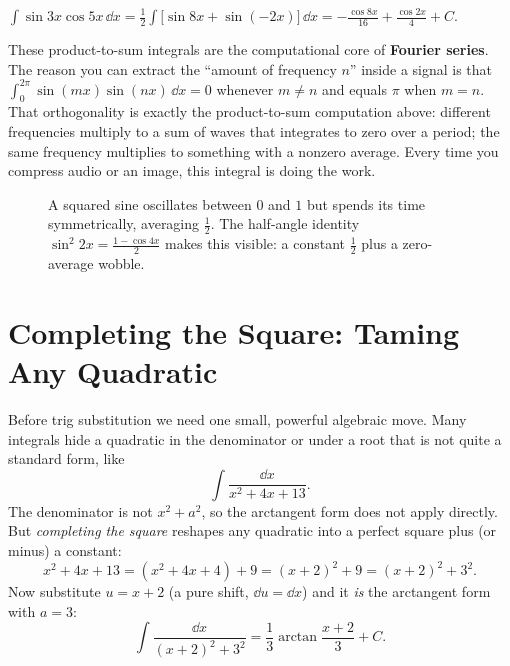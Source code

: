 \begin{example}
$\displaystyle \int \sin 3x\cos 5x\,\dd x
= \frac{1}{2}\int \big[\sin 8x + \sin(-2x)\big]\,\dd x
= -\frac{\cos 8x}{16} + \frac{\cos 2x}{4} + C.$
\end{example}

\begin{connectionbox}
These product-to-sum integrals are the computational core of \textbf{Fourier
series}. The reason you can extract the ``amount of frequency $n$'' inside a
signal is that $\int_0^{2\pi}\sin(mx)\sin(nx)\,\dd x = 0$ whenever $m \neq n$
and equals $\pi$ when $m = n$. That orthogonality is exactly the product-to-sum
computation above: different frequencies multiply to a sum of waves that
integrates to zero over a period; the same frequency multiplies to something
with a nonzero average. Every time you compress audio or an image, this
integral is doing the work.
\end{connectionbox}

\begin{figure}[H]
\centering
{}
\caption{A squared sine oscillates between $0$ and $1$ but spends its time
symmetrically, averaging $\tfrac12$. The half-angle identity
$\sin^2 2x = \tfrac{1-\cos 4x}{2}$ makes this visible: a constant $\tfrac12$
plus a zero-average wobble.}
\label{ch24:fig-sin2}
\end{figure}

\section{Completing the Square: Taming Any Quadratic}
\label{ch24:complete-square}

Before trig substitution we need one small, powerful algebraic move. Many
integrals hide a quadratic in the denominator or under a root that is not
quite a standard form, like
\[
\int \frac{\dd x}{x^2 + 4x + 13}.
\]
The denominator is not $x^2 + a^2$, so the arctangent form does not apply
directly. But \emph{completing the square} reshapes any quadratic into a
perfect square plus (or minus) a constant:
\[
x^2 + 4x + 13 = (x^2 + 4x + 4) + 9 = (x+2)^2 + 9 = (x+2)^2 + 3^2.
\]
Now substitute $u = x + 2$ (a pure shift, $\dd u = \dd x$) and it \emph{is} the
arctangent form with $a = 3$:
\[
\int \frac{\dd x}{(x+2)^2 + 3^2}
= \frac{1}{3}\arctan\!\frac{x+2}{3} + C.
\]


